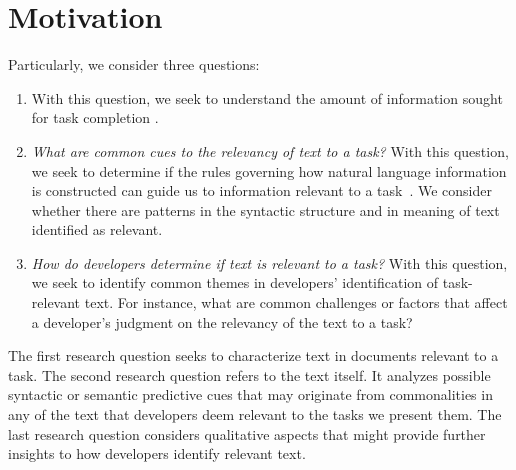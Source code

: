 \section{Motivation}
\label{cp3:method}




Particularly, we consider three questions:


\begin{enumerate}[label=\textit{RQ\arabic*},leftmargin=*]

    \item {} With this question, we seek to understand
    the amount of information sought for task completion
     .

    \item \textit{What are common cues to the relevancy of text to a task?}
    With this question, we seek to determine if the rules governing how natural language information
    is constructed can guide us to information relevant to a task~\cite{Kintsch1978a}.
    We consider whether there
    are patterns in the  syntactic structure and in meaning of text identified as relevant.

    \item \textit{How do developers determine if text is relevant to a task?}
    With this question, we seek to identify common themes in developers' identification of task-relevant text. For instance, what are common challenges or factors that affect a developer's judgment on the relevancy of the text to a task?

\end{enumerate}



The first research question seeks to characterize text
in documents relevant to a task.
The second research question refers to the text itself.
It analyzes possible syntactic or semantic
predictive cues that may originate from commonalities in any of the text that developers deem relevant to the tasks we present them.
The last research question considers qualitative aspects that might provide
further insights to how developers identify relevant text.

